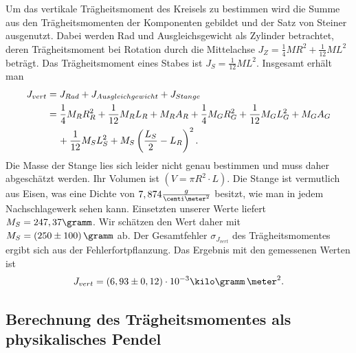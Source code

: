 \documentclass[12pt, a4paper, twoside]{scrartcl}
\begin{document}
Um das vertikale Trägheitsmoment des Kreisels zu bestimmen wird die Summe aus den Trägheitsmomenten der Komponenten gebildet und der Satz von Steiner ausgenutzt. Dabei werden Rad und Ausgleichsgewicht als Zylinder betrachtet, deren Trägheitsmoment bei Rotation durch die Mittelachse $J_Z=\frac{1}{4}MR^2+\frac{1}{12}ML^2$ beträgt. Das Trägheitsmoment eines Stabes ist $J_S=\frac{1}{12}ML^2$. Insgesamt erhält man
\begin{align*}
J_{vert}&=J_{Rad}+J_{Ausgleichgewicht}+J_{Stange}\\
			&=\frac{1}{4}M_RR_R^2+\frac{1}{12}M_RL_R+M_RA_R+\frac{1}{4}M_GR_G^2+\frac{1}{12}M_GL_G^2+M_GA_G\\
			&\hspace{0.4cm}+\frac{1}{12}M_SL_S^2+M_S\left(\frac{L_S}{2}-L_R\right)^2.
\end{align*}
Die Masse der Stange lies sich leider nicht genau bestimmen und muss daher abgeschätzt werden. Ihr Volumen ist $(V=\pi R^2\cdot L)$. Die Stange ist vermutlich aus Eisen, was eine Dichte von $7,874\frac{g}{\centi\meter^2}$ besitzt, wie man in jedem Nachschlagewerk sehen kann. Einsetzten unserer Werte liefert $M_S=247,37\gramm$. Wir schätzen den Wert daher mit $M_S=\left(250\pm100\right)\gramm$ ab. Der Gesamtfehler $\sigma_{J_{vert}}$ des Trägheitsmomentes ergibt sich aus der Fehlerfortpflanzung. Das Ergebnis mit den gemessenen Werten ist
\begin{align*}
J_{vert}=\left(6,93\pm0,12\right)\cdot10^{-3}\kilo\gramm\,\meter^2.
\end{align*}

\subsection{Berechnung des Trägheitsmomentes als physikalisches Pendel}
\end{document}
